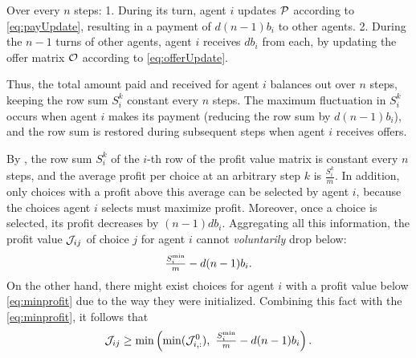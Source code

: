 \begin{customproof}
 Over every $n$ steps:
1. During its turn, agent $i$ updates $\mathcal{P}$ according to \cref{eq:payUpdate}, resulting in a payment of $d(n-1)b_i$ to other agents.
2. During the $n-1$ turns of other agents, agent $i$ receives $db_i$ from each, by updating the offer matrix $\mathcal{O}$ according to \cref{eq:offerUpdate}.

Thus, the total amount paid and received for agent $i$ balances out over $n$ steps, keeping the row sum $S_i^k$ constant every $n$ steps. The maximum fluctuation in $S_i^k$ occurs when agent $i$ makes its payment (reducing the row sum by $d(n-1)b_i$), and the row sum is restored during subsequent steps when agent $i$ receives offers. 
\end{customproof}

\begin{customproof}
By , the row sum $S_i^k$ of the $i$-th row of the profit value matrix is constant every $n$ steps, and the average profit per choice at an arbitrary step $k$ is $\frac{S_i^k}{m}$. In addition, only choices with a profit above this average can be selected by agent $i$, because the choices agent $i$ selects must maximize profit. Moreover, once a choice is selected, its profit decreases by $(n-1)d b_i$. Aggregating all this information, 
 the profit value $\mathcal{J}_{ij}$ of choice $j$ for agent $i$ cannot \textit{voluntarily} drop below:
\begin{equation}\label{eq:minprofit}
    \textstyle{\frac{S_i^{\mathrm{min}}}{m}} - d(n-1)b_i.
\end{equation}
On the other hand, there might exist choices for agent $i$ with a profit value below \eqref{eq:minprofit} due to the way they were initialized. Combining this fact with the \eqref{eq:minprofit}, it follows that 
\begin{equation}
\mathcal{J}_{ij} \geq \min\left(\min(\mathcal{J}_{i,:}^{0}),\ \textstyle{\frac{S_i^{\mathrm{min}}}{m}} - d(n-1)b_i\right).
\end{equation}
\end{customproof}


